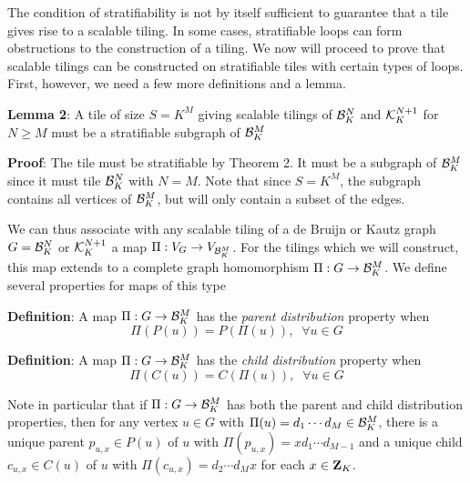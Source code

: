 \documentclass[12pt]{article}
\begin{document}
The condition of stratifiability is not by itself sufficient to
guarantee that a tile gives rise to a scalable tiling.   In some
cases, stratifiable loops can form obstructions to the construction of
a tiling.  We now will proceed to prove that scalable tilings can be
constructed on stratifiable tiles with certain types of loops.  First,
however, we need a few more definitions and a lemma.

\vspace*{0.1in}


\noindent
{\bf Lemma 2}: A tile of size $S = K^M$ giving scalable tilings of
${\cal
B}_K^N$ and ${\cal K}_K^{N + 1}$  for $N \geq M$ must be a
stratifiable subgraph of
${\cal B}_K^M$
\vspace*{0.1in}

\noindent
{\bf Proof}: The tile must be stratifiable by Theorem 2.  It must be a
subgraph of ${\cal
B}_K^M$ since it must tile ${\cal
B}_K^N$ with $N = M$.
Note that since $S = K^M$, the subgraph contains all vertices of
${\cal B}_K^M$, but will only contain a subset of the edges.
\vspace*{0.1in}

We can thus associate with any scalable tiling of a de Bruijn or Kautz graph
$G ={\cal
B}_K^N$ or ${\cal K}_K^{N + 1}$  a map
$\Pi:V_G \rightarrow V_{{\cal B}_K^M}$.  For the tilings which we will
construct, this map extends to a complete graph homomorphism
$\Pi:G \rightarrow {\cal B}_K^M$.  
We define several properties for
maps of this type
\vspace*{0.1in}

\noindent
{\bf Definition}:  A map $\Pi:G \rightarrow {\cal B}_K^M$ has  the
{\it parent distribution} property when
\begin{equation}
\Pi (P (u)) = P (\Pi (u)), \; \; \forall u \in G
\label{eq:pdp}
\end{equation}
\vspace*{0.1in}

\noindent
{\bf Definition}:  A map $\Pi:G \rightarrow {\cal B}_K^M$ has  the
{\it child distribution} property when
\begin{equation}
\Pi (C (u)) =  C (\Pi (u)), \; \; \forall u \in G
\label{eq:cdp}
\end{equation}

Note in particular that if $\Pi:G \rightarrow {\cal B}_K^M$ has both
the parent and child distribution properties, then for any vertex $u
\in G$ with $\Pi(u) =d_1
\cdots d_M \in {\cal B}_K^M$, there is a unique parent $p_{u, x}\in P
(u)$ of $u$ with $\Pi (p_{u, x}) = xd_1 \cdots d_{M -1}$ and a unique child
$c_{u, x}\in  C
(u)$ of $u$ with $\Pi (c_{u, x}) = d_2 \cdots d_{M} x$ for each $x \in
{\bf Z}_K$.
\vspace*{0.1in}
\end{document}
